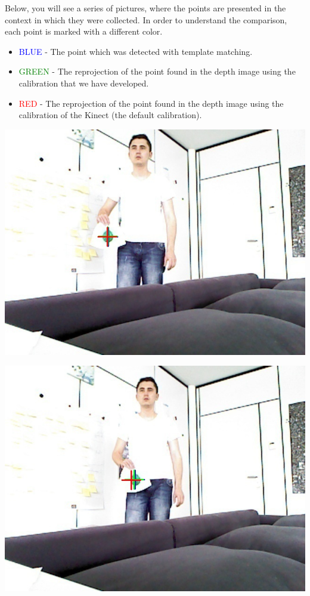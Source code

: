 \noindent
Below, you will see a series of pictures, where the points are presented in the context in which they were collected. In order to understand the comparison, each point is marked with a different color. 

\begin{itemize}
	\item \textcolor{blue}{BLUE} - The point which was detected with template matching.
	\item \textcolor{green}{GREEN} - The reprojection of the point found in the depth image using the calibration that we have developed.
	\item \textcolor{red}{RED} - The reprojection of the point found in the depth image using the calibration of the Kinect (the default calibration). 
\end{itemize}

\begin{center}
	\includegraphics[scale=0.6]{images/compare_output/rgb_image_1.jpg}
\end{center}

\begin{center}
	\includegraphics[scale=0.6]{images/compare_output/rgb_image_2.jpg}
\end{center}

